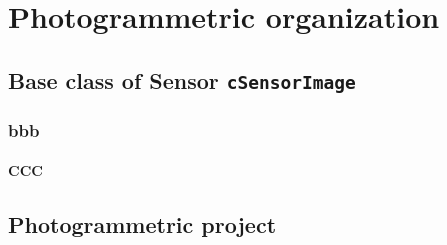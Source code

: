 

\chapter{Photogrammetric organization}



\section{Base class of Sensor {\tt cSensorImage}}


\subsection{bbb}

\subsubsection{CCC}


\section{Photogrammetric project}
